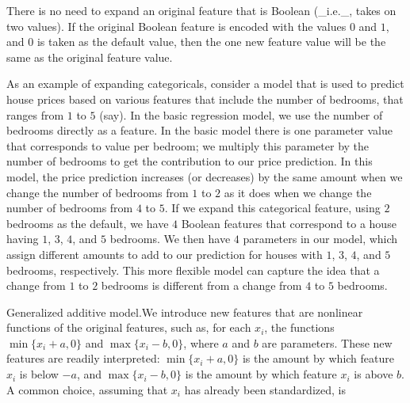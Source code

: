 There is no need to expand an original feature that is Boolean (_i.e._, takes on two values). If the original Boolean feature is encoded with the values \(0\) and \(1\), and \(0\) is taken as the default value, then the one new feature value will be the same as the original feature value.

As an example of expanding categoricals, consider a model that is used to predict house prices based on various features that include the number of bedrooms, that ranges from \(1\) to \(5\) (say). In the basic regression model, we use the number of bedrooms directly as a feature. In the basic model there is one parameter value that corresponds to value per bedroom; we multiply this parameter by the number of bedrooms to get the contribution to our price prediction. In this model, the price prediction increases (or decreases) by the same amount when we change the number of bedrooms from \(1\) to \(2\) as it does when we change the number of bedrooms from \(4\) to \(5\). If we expand this categorical feature, using \(2\) bedrooms as the default, we have \(4\) Boolean features that correspond to a house having \(1\), \(3\), \(4\), and \(5\) bedrooms. We then have \(4\) parameters in our model, which assign different amounts to add to our prediction for houses with \(1\), \(3\), \(4\), and \(5\) bedrooms, respectively. This more flexible model can capture the idea that a change from \(1\) to \(2\) bedrooms is different from a change from \(4\) to \(5\) bedrooms.

Generalized additive model.We introduce new features that are nonlinear functions of the original features, such as, for each \(x_{i}\), the functions \(\min\{x_{i}+a,0\}\) and \(\max\{x_{i}-b,0\}\), where \(a\) and \(b\) are parameters. These new features are readily interpreted: \(\min\{x_{i}+a,0\}\) is the amount by which feature \(x_{i}\) is below \(-a\), and \(\max\{x_{i}-b,0\}\) is the amount by which feature \(x_{i}\) is above \(b\). A common choice, assuming that \(x_{i}\) has already been standardized, is 
